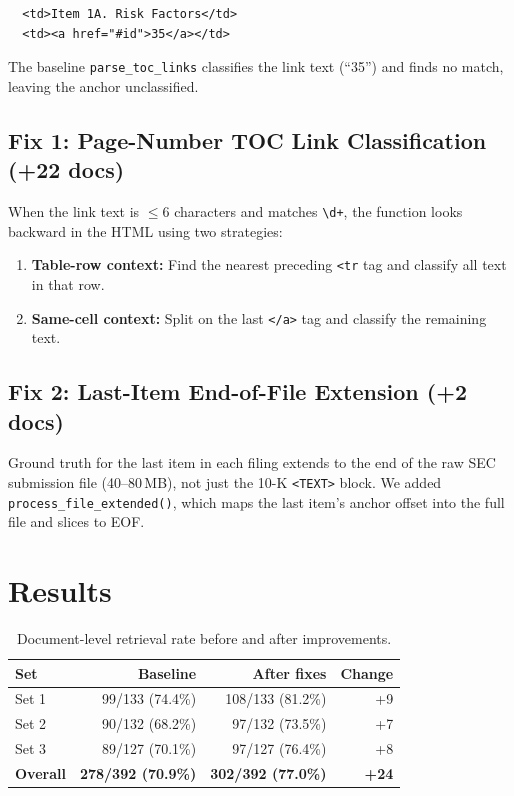 \documentclass[11pt,a4paper]{article}
\begin{document}
\begin{verbatim}
  <td>Item 1A. Risk Factors</td>
  <td><a href="#id">35</a></td>
\end{verbatim}

\noindent
The baseline \texttt{parse\_toc\_links} classifies the link text (``35'') and finds no match, leaving the anchor unclassified.

\subsection{Fix 1: Page-Number TOC Link Classification (+22 docs)}

When the link text is $\leq 6$ characters and matches \verb|\d+|, the function looks backward in the HTML using two strategies:

\begin{enumerate}[nosep]
    \item \textbf{Table-row context:} Find the nearest preceding \texttt{<tr} tag and classify all text in that row.
    \item \textbf{Same-cell context:} Split on the last \texttt{</a>} tag and classify the remaining text.
\end{enumerate}

\subsection{Fix 2: Last-Item End-of-File Extension (+2 docs)}

Ground truth for the last item in each filing extends to the end of the raw SEC submission file (40--80\,MB), not just the 10-K \texttt{<TEXT>} block. We added \texttt{process\_file\_extended()}, which maps the last item's anchor offset into the full file and slices to EOF.

\section{Results}

\begin{table}[H]
\centering
\caption{Document-level retrieval rate before and after improvements.}
\begin{tabular}{lrrr}
\toprule
\textbf{Set} & \textbf{Baseline} & \textbf{After fixes} & \textbf{Change}\\
\midrule
Set 1 & 99/133 (74.4\%) & 108/133 (81.2\%) & +9\\
Set 2 & 90/132 (68.2\%) & 97/132 (73.5\%) & +7\\
Set 3 & 89/127 (70.1\%) & 97/127 (76.4\%) & +8\\
\midrule
\textbf{Overall} & \textbf{278/392 (70.9\%)} & \textbf{302/392 (77.0\%)} & \textbf{+24}\\
\bottomrule
\end{tabular}
\end{table}
\end{document}
